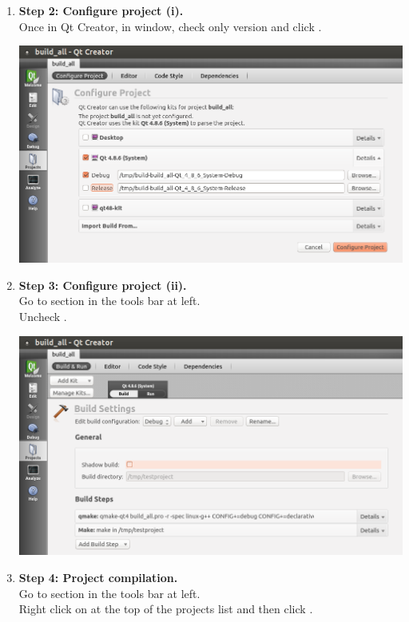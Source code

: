\begin{enumerate}
%
\item {\bf Step 2: Configure project (i).}\\
%
  Once in Qt Creator, in
   window, check only  version
  and click .


\vspace{1ex}
\includegraphics[width=.95\textwidth]{images/tug032.png}
\vspace{3ex}
\newpage

%
\item {\bf Step 3: Configure project (ii).}\\
%
  Go to 
  section in the tools bar at left. \\Uncheck {}.


\vspace{1ex}
\includegraphics[width=.95\textwidth]{images/tug033.png}
\vspace{3ex}

%
\item {\bf Step 4: Project compilation.}\\
%
  Go to 
  section in the tools bar at left. \\Right click on
   at the top of the projects list and then
  click .


\end{enumerate}
